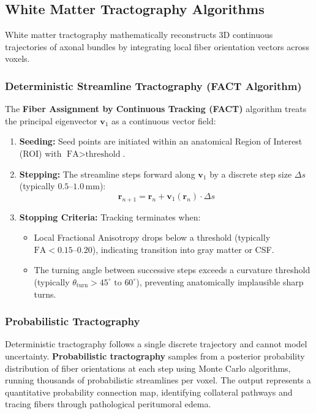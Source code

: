 \documentclass[11pt,a4paper]{article}
\begin{document}
\subsection{White Matter Tractography Algorithms}

White matter tractography mathematically reconstructs 3D continuous trajectories of axonal bundles by integrating local fiber orientation vectors across voxels.

\subsubsection{Deterministic Streamline Tractography (FACT Algorithm)}
The \textbf{Fiber Assignment by Continuous Tracking (FACT)} algorithm treats the principal eigenvector $\mathbf{v}_1$ as a continuous vector field:
\begin{enumerate}[leftmargin=*]
    \item \textbf{Seeding:} Seed points are initiated within an anatomical Region of Interest (ROI) with $\text{FA} > \text{threshold}$.
    \item \textbf{Stepping:} The streamline steps forward along $\mathbf{v}_1$ by a discrete step size $\Delta s$ (typically $0.5\text{--}1.0\,\text{mm}$):
    \begin{equation}
        \mathbf{r}_{n+1} = \mathbf{r}_n + \mathbf{v}_1(\mathbf{r}_n) \cdot \Delta s
    \end{equation}
    \item \textbf{Stopping Criteria:} Tracking terminates when:
    \begin{itemize}
        \item Local Fractional Anisotropy drops below a threshold (typically $\text{FA} < 0.15\text{--}0.20$), indicating transition into gray matter or CSF.
        \item The turning angle between successive steps exceeds a curvature threshold (typically $\theta_{\text{turn}} > 45^\circ\text{ to }60^\circ$), preventing anatomically implausible sharp turns.
    \end{itemize}
\end{enumerate}

\subsubsection{Probabilistic Tractography}
Deterministic tractography follows a single discrete trajectory and cannot model uncertainty. \textbf{Probabilistic tractography} samples from a posterior probability distribution of fiber orientations at each step using Monte Carlo algorithms, running thousands of probabilistic streamlines per voxel. The output represents a quantitative probability connection map, identifying collateral pathways and tracing fibers through pathological peritumoral edema.
\end{document}
